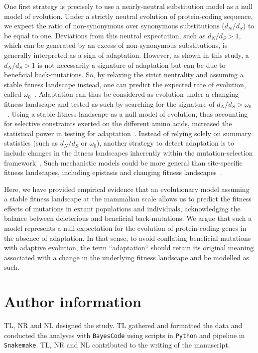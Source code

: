 \documentclass[9pt,twocolumn,twoside,lineno]{pnas-new}
\newcommand{\dn}{d_N}
\newcommand{\ds}{d_S}
\newcommand{\dnds}{\dn / \ds}
\begin{document}
One first strategy is precisely to use a nearly-neutral substitution model as a null model of evolution.
Under a strictly neutral evolution of protein-coding sequence, we expect the ratio of non-synonymous over synonymous substitutions ($\dnds$) to be equal to one.
Deviations from this neutral expectation, such as $\dnds > 1$, which can be generated by an excess of non-synonymous substitutions, is generally interpreted as a sign of adaptation.
However, as shown in this study, a $\dnds > 1$ is not necessarily a signature of adaptation but can be due to beneficial back-mutations.
So, by relaxing the strict neutrality and assuming a stable fitness landscape instead, one can predict the expected rate of evolution, called $\omega_0$~\cite{spielman_relationship_2015, dosreis_how_2015}.
Adaptation can thus be considered as evolution under a changing fitness landscape and tested as such by searching for the signature of $\dnds > \omega_0$~\cite{cvijovic_fate_2015, rodrigue_detecting_2017, rodrigue_bayesian_2021}.
Using a stable fitness landscape as a null model of evolution, thus accounting for selective constraints exerted on the different amino acids, increased the statistical power in testing for adaptation~\cite{latrille_genes_2023}.
Instead of relying solely on summary statistics (such as $\dnds$ or $\omega_0$), another strategy to detect adaptation is to include changes in the fitness landscapes inherently within the mutation-selection framework~\cite{tamuri_mutationselection_2021}.
Such mechanistic models could be more general than site-specific fitness landscapes, including epistasis and changing fitness landscapes~\cite{goldstein_sequence_2017, stolyarova_senescence_2020}.

Here, we have provided empirical evidence that an evolutionary model assuming a stable fitness landscape at the mammalian scale allows us to predict the fitness effects of mutations in extant populations and individuals, acknowledging the balance between deleterious and beneficial back-mutations.
We argue that such a model represents a null expectation for the evolution of protein-coding genes in the absence of adaptation.
In that sense, to avoid conflating beneficial mutations with adaptive evolution, the term ``adaptation`` should retain its original meaning associated with a change in the underlying fitness landscape and be modelled as such.

\section{Author information}\label{sec:author-information}
TL, NR and NL designed the study.
TL gathered and formatted the data and conducted the analyses with \texttt{BayesCode} using scripts in \texttt{Python} and pipeline in \texttt{Snakemake}.
TL, NR and NL contributed to the writing of the manuscript.
\end{document}
